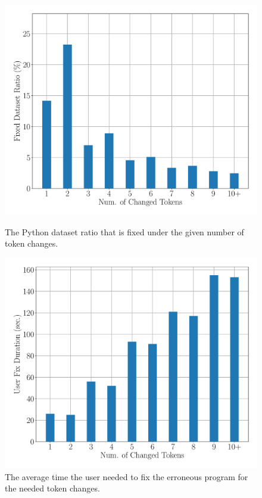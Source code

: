 \begin{figure}[t]
  \centering
  \begin{minipage}[c]{0.48\linewidth}
    \centering
    \includegraphics[width=\linewidth]{dataset-ratio-per-change.pdf}
    \caption{The Python dataset ratio that is fixed under the given number of
     token changes.}
    \label{fig:token-changes-ratio}
  \end{minipage}
  \hspace{0.02\linewidth}
  \begin{minipage}[c]{0.48\linewidth}
      \centering
      \includegraphics[width=\linewidth]{median-repair-times.pdf}
      \caption{The average time the user needed to fix the erroneous program
      for the needed token changes.}
      \label{fig:token-changes}
  \end{minipage}
\end{figure}

